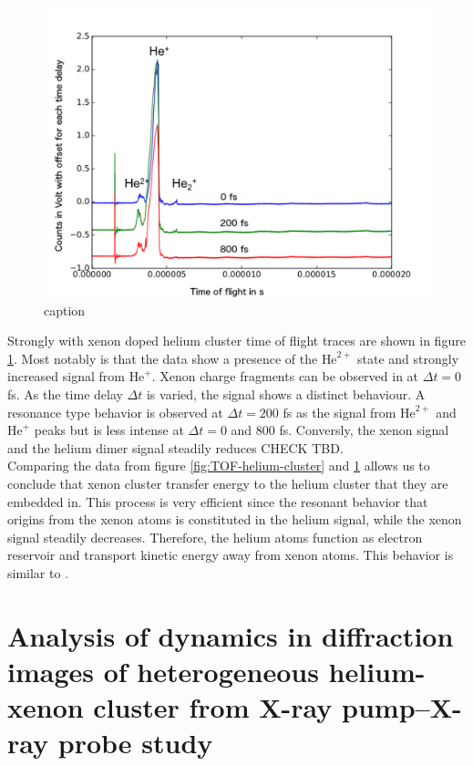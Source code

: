 \begin{figure}
	\centering{}
		\includegraphics[width=1.00\textwidth]{images/results/TOF-helium-xenon-cluster-60.png}
	\caption{caption}
	\label{fig:TOF-helium-xenon-cluster-60}
\end{figure}
Strongly with xenon doped helium cluster time of flight traces are shown in figure \ref{fig:TOF-helium-xenon-cluster-60}. Most notably is that the data show a presence of the $\text{He}^{2+}$ state and strongly increased signal from $\text{He}^{+}$. Xenon charge fragments can be observed in at $\Delta t = 0$ fs. As the time delay $\Delta t$ is varied, the signal shows a distinct behaviour. A resonance type behavior is observed at $\Delta t = 200$ fs as the signal from $\text{He}^{2+}$ and $\text{He}^{+}$ peaks but is less intense at $\Delta t = 0$ and 800 fs. Conversly, the xenon signal and the helium dimer signal steadily reduces CHECK TBD.\\
Comparing the data from figure \ref{fig:TOF-helium-cluster} and \ref{fig:TOF-helium-xenon-cluster-60} allows us to conclude that xenon cluster transfer energy to the helium cluster that they are embedded in. This process is very efficient since the resonant behavior that origins from the xenon atoms is constituted in the helium signal, while the xenon signal steadily decreases. Therefore, the helium atoms function as electron reservoir and transport kinetic energy away from xenon atoms. This behavior is similar to \citep{TBD}. 
%
%
%
\section{Analysis of dynamics in diffraction images of heterogeneous helium-xenon cluster from X-ray pump--X-ray probe study}\label{sec:helium-data}


